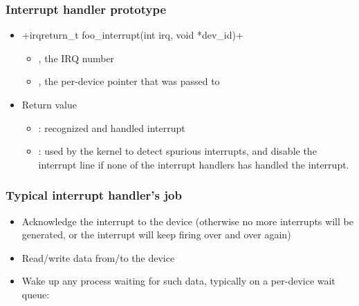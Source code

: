 \begin{frame}[fragile]
  \frametitle{Interrupt handler prototype}
  \begin{itemize}
  \item {}+irqreturn_t foo_interrupt(int irq, void *dev_id)+
    \begin{itemize}
    \item {}, the IRQ number
    \item {}, the per-device pointer that was
      passed to 
    \end{itemize}
  \item Return value
    \begin{itemize}
    \item {}: recognized and handled interrupt
    \item {}: used by the kernel to detect spurious
	interrupts, and disable the interrupt line if none of the
	interrupt handlers has handled the interrupt.
    \end{itemize}
  \end{itemize}
\end{frame}

\begin{frame}
  \frametitle{Typical interrupt handler's job}
  \begin{itemize}
  \item Acknowledge the interrupt to the device (otherwise no more
    interrupts will be generated, or the interrupt will keep firing
    over and over again)
  \item Read/write data from/to the device
  \item Wake up any process waiting for such data, typically on a
    per-device wait queue:\\
\end{itemize}
\end{frame}


